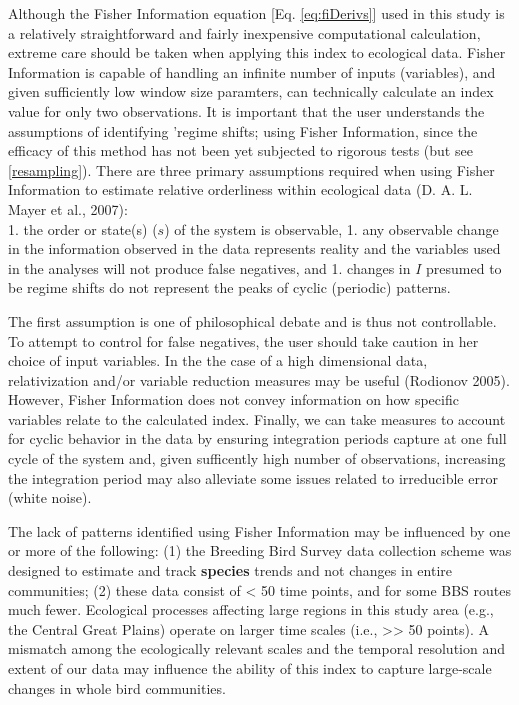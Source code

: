 \documentclass[12pt,twoside,openany]{reedthesis}
\begin{document}
Although the Fisher Information equation {[}Eq. \eqref{eq:fiDerivs}{]}
used in this study is a relatively straightforward and fairly
inexpensive computational calculation, extreme care should be taken when
applying this index to ecological data. Fisher Information is capable of
handling an infinite number of inputs (variables), and given
sufficiently low window size paramters, can technically calculate an
index value for only two observations. It is important that the user
understands the assumptions of identifying 'regime shifts; using Fisher
Information, since the efficacy of this method has not been yet
subjected to rigorous tests (but see \ref{resampling}). There are three
primary assumptions required when using Fisher Information to estimate
relative orderliness within ecological data (D. A. L. Mayer et al.,
2007):\\
1. the order or state(s) (\(s\)) of the system is observable, 1. any
observable change in the information observed in the data represents
reality and the variables used in the analyses will not produce false
negatives, and 1. changes in \(I\) presumed to be regime shifts do not
represent the peaks of cyclic (periodic) patterns.

The first assumption is one of philosophical debate and is thus not
controllable. To attempt to control for false negatives, the user should
take caution in her choice of input variables. In the the case of a high
dimensional data, relativization and/or variable reduction measures may
be useful (Rodionov 2005). However, Fisher Information does not convey
information on how specific variables relate to the calculated index.
Finally, we can take measures to account for cyclic behavior in the data
by ensuring integration periods capture at one full cycle of the system
and, given sufficently high number of observations, increasing the
integration period may also alleviate some issues related to irreducible
error (white noise).

The lack of patterns identified using Fisher Information may be
influenced by one or more of the following: (1) the Breeding Bird Survey
data collection scheme was designed to estimate and track
\textbf{species} trends and not changes in entire communities; (2) these
data consist of \textless{} 50 time points, and for some BBS routes much
fewer. Ecological processes affecting large regions in this study area
(e.g., the Central Great Plains) operate on larger time scales (i.e.,
\textgreater{}\textgreater{} 50 points). A mismatch among the
ecologically relevant scales and the temporal resolution and extent of
our data may influence the ability of this index to capture large-scale
changes in whole bird communities.
\end{document}
